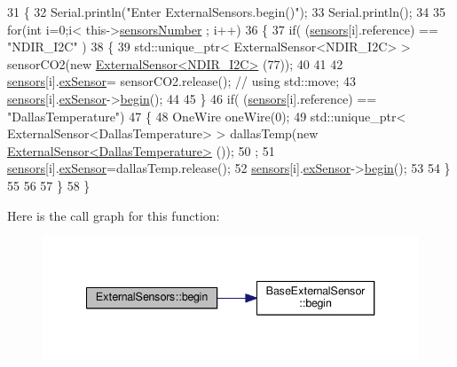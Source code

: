 \begin{DoxyCode}
31 \{
32     Serial.println(\textcolor{stringliteral}{"Enter ExternalSensors.begin()"});
33     Serial.println();
34 
35     \textcolor{keywordflow}{for}(\textcolor{keywordtype}{int} i=0;i< this->\hyperlink{classExternalSensors_a58e4fbf9adeae787d92be5fa33043b5d}{sensorsNumber} ; i++)
36     \{
37         \textcolor{keywordflow}{if}( (\hyperlink{classExternalSensors_a284233f884fcf00154a44740cf1d9e1e}{sensors}[i].reference) == \textcolor{stringliteral}{"NDIR\_I2C"} )
38         \{   
39             std::unique\_ptr< ExternalSensor<NDIR\_I2C> > sensorCO2(\textcolor{keyword}{new} 
      \hyperlink{classExternalSensor_3_01NDIR__I2C_01_4}{ExternalSensor<NDIR\_I2C>} (77));
40 
41 
42             \hyperlink{classExternalSensors_a284233f884fcf00154a44740cf1d9e1e}{sensors}[i].\hyperlink{structExternalSensors_1_1sensor_a9bca150fd468b8d0e090e6d72c5c2b48}{exSensor}= sensorCO2.release();                       \textcolor{comment}{// using
       std::move;}
43             \hyperlink{classExternalSensors_a284233f884fcf00154a44740cf1d9e1e}{sensors}[i].\hyperlink{structExternalSensors_1_1sensor_a9bca150fd468b8d0e090e6d72c5c2b48}{exSensor}->\hyperlink{classBaseExternalSensor_a87d132803d4f4fdd4e66332809f0c9a0}{begin}();
44 
45         \}
46         \textcolor{keywordflow}{if}( (\hyperlink{classExternalSensors_a284233f884fcf00154a44740cf1d9e1e}{sensors}[i].reference) == \textcolor{stringliteral}{"DallasTemperature"})
47         \{
48             OneWire oneWire(0);
49             std::unique\_ptr< ExternalSensor<DallasTemperature> > dallasTemp(\textcolor{keyword}{new} 
      \hyperlink{classExternalSensor_3_01DallasTemperature_01_4}{ExternalSensor<DallasTemperature>} ());
50              ;
51             \hyperlink{classExternalSensors_a284233f884fcf00154a44740cf1d9e1e}{sensors}[i].\hyperlink{structExternalSensors_1_1sensor_a9bca150fd468b8d0e090e6d72c5c2b48}{exSensor}=dallasTemp.release();
52             \hyperlink{classExternalSensors_a284233f884fcf00154a44740cf1d9e1e}{sensors}[i].\hyperlink{structExternalSensors_1_1sensor_a9bca150fd468b8d0e090e6d72c5c2b48}{exSensor}->\hyperlink{classBaseExternalSensor_a87d132803d4f4fdd4e66332809f0c9a0}{begin}();
53             
54         \}
55         
56         
57     \}
58 \}
\end{DoxyCode}
Here is the call graph for this function\+:\nopagebreak
\begin{figure}[H]
\begin{center}
\leavevmode
\includegraphics[width=340pt]{classExternalSensors_a58ede0d786a86417254708870f04a21e_cgraph}
\end{center}
\end{figure}
